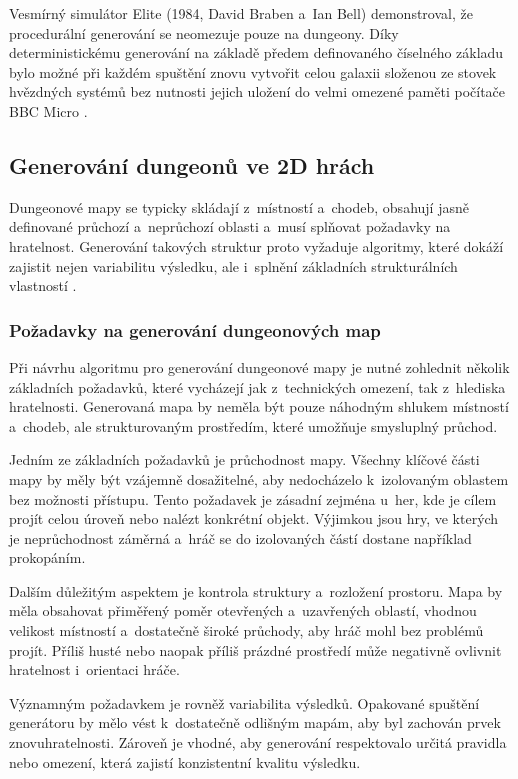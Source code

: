\documentclass[
   program=itk,
   biblatex,
   figures=true,
   tables=true,
   glossaries,
   index
]{kidiplom}
\begin{document}
Vesmírný simulátor Elite (1984, David Braben a~Ian Bell) demonstroval, že procedurální generování se neomezuje pouze na dungeony. Díky deterministickému generování na základě předem definovaného číselného základu bylo možné při každém spuštění znovu vytvořit celou galaxii složenou ze stovek hvězdných systémů bez nutnosti jejich uložení do velmi omezené paměti počítače BBC Micro \cite{EliteWiki}.

\subsection{Generování dungeonů ve 2D hrách}
Dungeonové mapy se typicky skládají z~místností a~chodeb, obsahují jasně definované průchozí a~neprůchozí oblasti a~musí splňovat požadavky na hratelnost. Generování takových struktur proto vyžaduje algoritmy, které dokáží zajistit nejen variabilitu výsledku, ale i~splnění základních strukturálních vlastností \cite{Linden2014,Shaker2016}.

\subsubsection{Požadavky na generování dungeonových map}
Při návrhu algoritmu pro generování dungeonové mapy je nutné zohlednit několik základních požadavků, které vycházejí jak z~technických omezení, tak z~hlediska hratelnosti. Generovaná mapa by neměla být pouze náhodným shlukem místností a~chodeb, ale strukturovaným prostředím, které umožňuje smysluplný průchod.

Jedním ze základních požadavků je průchodnost mapy. Všechny klíčové části mapy by měly být vzájemně dosažitelné, aby nedocházelo k~izolovaným oblastem bez možnosti přístupu. Tento požadavek je zásadní zejména u~her, kde je cílem projít celou úroveň nebo nalézt konkrétní objekt. Výjimkou jsou hry, ve kterých je neprůchodnost záměrná a~hráč se do izolovaných částí dostane například prokopáním.

Dalším důležitým aspektem je kontrola struktury a~rozložení prostoru. Mapa by měla obsahovat přiměřený poměr otevřených a~uzavřených oblastí, vhodnou velikost místností a~dostatečně široké průchody, aby hráč mohl bez problémů projít. Příliš husté nebo naopak příliš prázdné prostředí může negativně ovlivnit hratelnost i~orientaci hráče.

Významným požadavkem je rovněž variabilita výsledků. Opakované spuštění generátoru by mělo vést k~dostatečně odlišným mapám, aby byl zachován prvek znovuhratelnosti. Zároveň je vhodné, aby generování respektovalo určitá pravidla nebo omezení, která zajistí konzistentní kvalitu výsledku.
\end{document}
